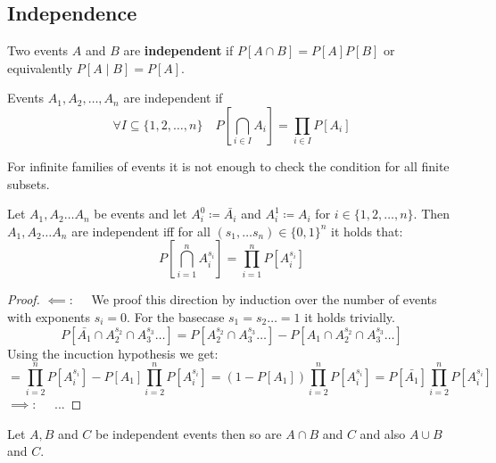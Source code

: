 \subsection{Independence}

\begin{definition}
    Two events $A$ and $B$ are \textbf{independent} if $P[A \cap B] = P[A] P[B]$ or equivalently $P[A \mid B] = P[A]$.
\end{definition}

\begin{definition}
    Events $A_1, A_2, \dots, A_n$ are independent if
    $$\forall I \subseteq \{1, 2, \dots, n\}\quad P[\bigcap_{i \in I} A_i] = \prod_{i \in I} P[A_i]$$
\end{definition}

\begin{remark}
    For infinite families of events it is not enough to check the condition for all finite subsets.
\end{remark}

\begin{lemma}
    Let $A_1, A_2 \dots A_n$ be events and let $A_i^{0} \coloneqq \bar{A_i}$ and $A_i^{1} \coloneqq A_i$ for $i \in \{1, 2, \dots, n\}$.
    Then $A_1, A_2 \dots A_n$ are independent iff for all $(s_1, \dots s_n) \in \{0,1\}^{n}$ it holds that:
    $$P[\bigcap_{i=1}^n A_i^{s_i}] = \prod_{i=1}^n P[A_i^{s_i}]$$
\end{lemma}

\begin{proof}
    $\impliedby: \quad$ We proof this direction by induction over the number of events with exponents $s_i = 0$. For the basecase $s_1 = s_2 \dots = 1$ it holds trivially.
    $$P[\bar{A_1} \cap A_2^{s_2} \cap A_3^{s_3} \dots] = P[A_2^{s_2} \cap A_3^{s_3} \dots] - P[A_1 \cap A_2^{s_2} \cap A_3^{s_3} \dots]$$
    Using the incuction hypothesis we get:
    $$= \prod_{i=2}^n P[A_i^{s_i}] - P[A_1]\prod_{i=2}^n P[A_i^{s_i}] = (1-P[A_1])\prod_{i=2}^n P[A_i^{s_i}] = P[\bar{A_1}]\prod_{i=2}^n P[A_i^{s_i}]$$
    $\implies: \quad$ ...
\end{proof}

\begin{lemma}
    Let $A, B$ and $C$ be independent events then so are $A \cap B$ and $C$ and also $A \cup B$ and $C$.
\end{lemma}

